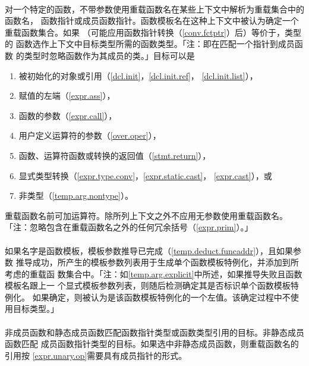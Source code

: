 \paragraph{}
对一个特定的函数，不带参数使用重载函数名在某些上下文中解析为重载集合中的函数名，
函数指针或成员函数指针。函数模板名在这种上下文中被认为确定一个重载函数集合。如果
（可能应用函数指针转换（\ref{conv.fctptr}）后）等价于，类型的
函数选作上下文中目标类型所需的函数类型。「注：即在匹配一个指针到成员函数
的类型时忽略函数作为其成员的类。」目标可以是
\begin{enumerate}
  \item{被初始化的对象或引用（\ref{dcl.init}，\ref{dcl.init.ref}，
    \ref{dcl.init.list}），}
  \item{赋值的左端（\ref{expr.ass}），}
  \item{函数的参数（\ref{expr.call}），}
  \item{用户定义运算符的参数（\ref{over.oper}），}
  \item{函数、运算符函数或转换的返回值（\ref{stmt.return}），}
  \item{显式类型转换（\ref{expr.type.conv}，\ref{expr.static.cast}，
    \ref{expr.cast}），或}
  \item{非类型（\ref{temp.arg.nontype}）。}
\end{enumerate}
重载函数名前可加\tm{\&}运算符。除所列上下文之外不应用无参数使用重载函数名。
「注：忽略包含在重载函数名之外的任何冗余括号（\ref{expr.prim}）。」

\paragraph{}
如果名字是函数模板，模板参数推导已完成（\ref{temp.deduct.funcaddr}），且如果参数
推导成功，所产生的模板参数列表用于生成单个函数模板特例化，并添加到所考虑的重载函
数集合中。「注：如\ref{temp.arg.explicit}中所述，如果推导失败且函数模板名跟上一
个显式模板参数列表，则随后检测确定其是否标识单个函数模板特例化。
如果确定，则被认为是该函数模板特例化的一个左值。该确定过程中不使
用目标类型。」

\paragraph{}
非成员函数和静态成员函数匹配函数指针类型或函数类型引用的目标。非静态成员函数匹配
成员函数指针类型的目标。如果选中非静态成员函数，则重载函数名的引用按
\ref{expr.unary.op}需要具有成员指针的形式。

